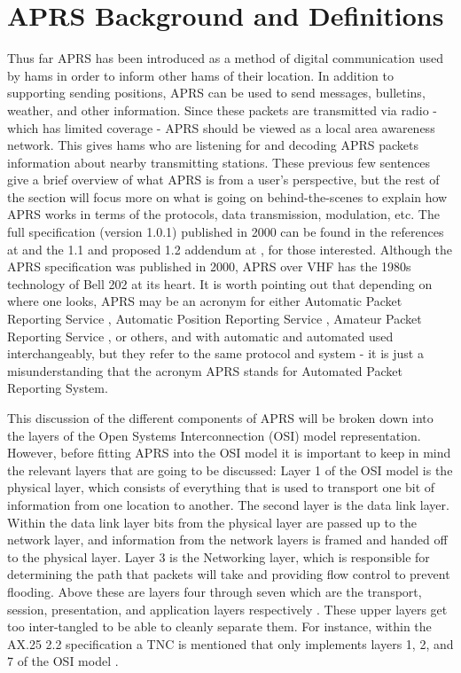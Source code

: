 \chapter{APRS Background and Definitions}
Thus far APRS has been introduced as a method of digital communication used by hams in order to inform other hams of their location. In addition to supporting sending positions, APRS can be used to send messages, bulletins, weather, and other information. Since these packets are transmitted via radio  - which has limited coverage - APRS should be viewed as a local area awareness network. This gives hams who are listening for and decoding APRS packets information about nearby transmitting stations. These previous few sentences give a brief overview of what APRS is from a user's perspective, but the rest of the section will focus more on what is going on behind-the-scenes to explain how APRS works in terms of the protocols, data transmission, modulation, etc. The full specification (version 1.0.1) published in 2000 can be found in the references at \cite{Group2000} and the 1.1 and proposed 1.2 addendum at \cite{Bruninga2004,Bruninga2013}, for those interested. Although the APRS specification was published in 2000, APRS over VHF has the 1980s technology of Bell 202 at its heart. It is worth pointing out that depending on where one looks, APRS may be an acronym for either Automatic Packet Reporting Service \cite{Bruninga}, Automatic Position Reporting Service \cite{Smith2012}, Amateur Packet Reporting Service \cite{Holder2012}, or others, and with automatic and automated used interchangeably, but they refer to the same protocol and system - it is just a misunderstanding that the acronym APRS stands for Automated Packet Reporting System.

This discussion of the different components of APRS will be broken down into the layers of the Open Systems Interconnection (OSI) model representation. However, before fitting APRS into the OSI model it is important to keep in mind the relevant layers that are going to be discussed: Layer 1 of the OSI model is the physical layer, which consists of everything that is used to transport one bit of information from one location to another. The second layer is the data link layer. Within the data link layer bits from the physical layer are passed up to the network layer, and information from the network layers is framed and handed off to the physical layer. Layer 3 is the Networking layer, which is responsible for determining the path that packets will take and providing flow control to prevent flooding. Above these are layers four through seven which are the transport, session, presentation, and application layers respectively \cite{Sosinsky2009}. These upper layers get too inter-tangled to be able to cleanly separate them. For instance, within the AX.25 2.2 specification a TNC is mentioned that only implements layers 1, 2, and 7 of the OSI model \cite{Beech1998}.

